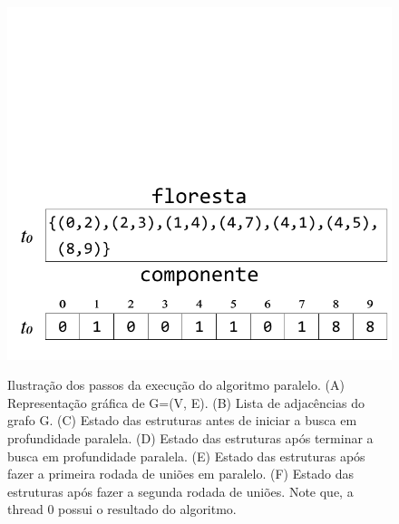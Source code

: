 \documentclass[12pt]{article}
\begin{document}
\begin{figure}[htp!]
{		\includegraphics[width=\linewidth]{figF.pdf}
	}
	\caption{Ilustração dos passos da execução do algoritmo paralelo. (A) Representação gráfica de G=(V, E). (B) Lista de adjacências do grafo G. (C) Estado das estruturas antes de iniciar a busca em profundidade paralela. (D) Estado das estruturas após terminar a busca em profundidade paralela. (E) Estado das estruturas após fazer a primeira rodada de uniões em paralelo. (F) Estado das estruturas após fazer a segunda rodada de uniões. Note que, a thread 0 possui o resultado do algoritmo.}
		\label{fig:1}
\end{figure}
\end{document}

